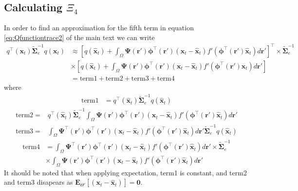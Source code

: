 \documentclass[]{article}
\begin{document}
\subsection*{Calculating $\Xi_{4}$}
In order to find an approximation for the fifth term in equation \ref{eq:Qfunctiontrace2} of the main text we can write
\begin{align}\label{eq:Xi4derivation1}
 q^\top(\mathbf x_t)\tilde{\boldsymbol\Sigma}_e^{-1}q(\mathbf x_t)&\approx \left[ q(\mathbf {\hat x}_t)+\int_\Omega \boldsymbol{\Psi}(\mathbf{r}')\boldsymbol \phi^\top(\mathbf r') (\mathbf x_t - \mathbf  {\hat x}_t)f'(\boldsymbol \phi^\top(\mathbf r')\mathbf {\hat x}_t) d\mathbf{r}'\right]^\top  \times \tilde{\boldsymbol\Sigma}_e^{-1}\nonumber \\
&\times\left[ q(\mathbf {\hat x}_t)+\int_\Omega \boldsymbol{\Psi}(\mathbf{r}')\boldsymbol \phi^\top(\mathbf r') (\mathbf x_t - \mathbf  {\hat x}_t)f'(\boldsymbol \phi^\top(\mathbf r')\mathbf {\hat x}_t) d\mathbf{r}'\right] \nonumber \\
&= \mathrm{term1} + \mathrm{term2} + \mathrm{term3} + \mathrm{term4}
\end{align}
where
\begin{align}
  \mathrm{term1}&=q^\top(\mathbf {\hat x}_t)\tilde{\boldsymbol\Sigma}_e^{-1}q(\mathbf {\hat x}_t)
\end{align}
\begin{align}
\mathrm{term2}=&q^\top(\mathbf {\hat x}_t)\tilde{\boldsymbol\Sigma}_e^{-1}\int_\Omega \boldsymbol{\Psi}(\mathbf{r}')\boldsymbol \phi^\top(\mathbf r') (\mathbf x_t - \mathbf  {\hat x}_t)f'(\boldsymbol \phi^\top(\mathbf r')\mathbf {\hat x}_t) d\mathbf{r}'
 \end{align}
\begin{align}
\mathrm{term3}=&\int_\Omega \boldsymbol{\Psi}^\top(\mathbf{r}')\boldsymbol \phi^\top(\mathbf r') (\mathbf x_t - \mathbf  {\hat x}_t)f'(\boldsymbol \phi^\top(\mathbf r')\mathbf {\hat x}_t) d\mathbf{r}'\tilde{\boldsymbol\Sigma}_e^{-1}q(\mathbf {\hat x}_t)
\end{align}
\begin{align}
 \mathrm{term4} &=\int_\Omega \boldsymbol{\Psi}^\top(\mathbf{r}')\boldsymbol \phi^\top(\mathbf r') (\mathbf x_t - \mathbf  {\hat x}_t)f'(\boldsymbol \phi^\top(\mathbf r')\mathbf {\hat x}_t) d\mathbf{r}' \times \tilde{\boldsymbol  \Sigma}_e^{-1} \nonumber \\
&\times \int_\Omega \boldsymbol{\Psi}(\mathbf{r}')\boldsymbol \phi^\top(\mathbf r') (\mathbf x_t - \mathbf  {\hat x}_t)f'(\boldsymbol \phi^\top(\mathbf r')\mathbf {\hat x}_t) d\mathbf{r}' 
\end{align}
It should be noted that when applying expectation, term1 is constant, and term2 and term3 disapears as $\mathbf E_{\Theta'}\left[(\mathbf x_t - \mathbf  {\hat x}_t)\right]= \mathbf 0$.
\end{document}
